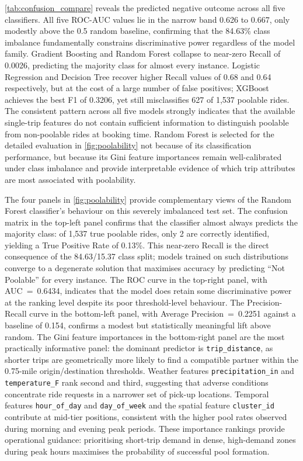 \autoref{tab:confusion_compare} reveals the predicted negative outcome across all five classifiers. All five ROC-AUC values lie in the narrow band 0.626 to 0.667, only modestly above the 0.5 random baseline, confirming that the 84.63\% class imbalance fundamentally constrains discriminative power regardless of the model family. Gradient Boosting and Random Forest collapse to near-zero Recall of 0.0026, predicting the majority class for almost every instance. Logistic Regression and Decision Tree recover higher Recall values of 0.68 and 0.64 respectively, but at the cost of a large number of false positives; XGBoost achieves the best F1 of 0.3206, yet still misclassifies 627 of 1,537 poolable rides. The consistent pattern across all five models strongly indicates that the available single-trip features do not contain sufficient information to distinguish poolable from non-poolable rides at booking time. Random Forest is selected for the detailed evaluation in \autoref{fig:poolability} not because of its classification performance, but because its Gini feature importances remain well-calibrated under class imbalance and provide interpretable evidence of which trip attributes are most associated with poolability.

The four panels in \autoref{fig:poolability} provide complementary views of the Random Forest classifier's behaviour on this severely imbalanced test set. The confusion matrix in the top-left panel confirms that the classifier almost always predicts the majority class: of 1,537 true poolable rides, only 2 are correctly identified, yielding a True Positive Rate of 0.13\%. This near-zero Recall is the direct consequence of the 84.63/15.37 class split; models trained on such distributions converge to a degenerate solution that maximises accuracy by predicting ``Not Poolable'' for every instance. The ROC curve in the top-right panel, with AUC~=~0.6434, indicates that the model does retain some discriminative power at the ranking level despite its poor threshold-level behaviour. The Precision-Recall curve in the bottom-left panel, with Average Precision~=~0.2251 against a baseline of 0.154, confirms a modest but statistically meaningful lift above random. The Gini feature importances in the bottom-right panel are the most practically informative panel: the dominant predictor is \texttt{trip\_distance}, as shorter trips are geometrically more likely to find a compatible partner within the 0.75-mile origin/destination thresholds. Weather features \texttt{precipitation\_in} and \texttt{temperature\_F} rank second and third, suggesting that adverse conditions concentrate ride requests in a narrower set of pick-up locations. Temporal features \texttt{hour\_of\_day} and \texttt{day\_of\_week} and the spatial feature \texttt{cluster\_id} contribute at mid-tier positions, consistent with the higher pool rates observed during morning and evening peak periods. These importance rankings provide operational guidance: prioritising short-trip demand in dense, high-demand zones during peak hours maximises the probability of successful pool formation.


